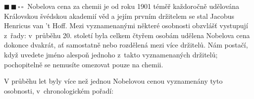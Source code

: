 \documentclass{book}
\newcommand{\dva}{$\blacksquare \, \blacksquare \, \square \, \square \; \; $}
\renewenvironment{quotation}{\par}{\par} %
\begin{document}
\hrulefill %
\begin{quotation}
\dva Nobelova cena za chemii je od roku 1901 téměř každoročně udělována
Královskou švédskou akademií věd a jejím prvním držitelem se stal
Jacobus Henricus van 't Hoff. Mezi vyznamenanými některé osobnosti
obzvlášť vystupují z~řady: v~průběhu 20. století byla celkem čtyřem
osobám udělena Nobelova cena dokonce dvakrát, ať samostatně nebo rozdělená
mezi více držitelů. Nám postačí, když uvedete jméno alespoň jednoho
z~takto vyznamenaných držitelů; pochopitelně se nemusíte omezovat
pouze na chemii.
\end{quotation} \dotfill \par 
V průběhu let byly více než jednou Nobelovou cenou vyznamenány tyto
osobnosti, v~chronologickém pořadí:
\end{document}
